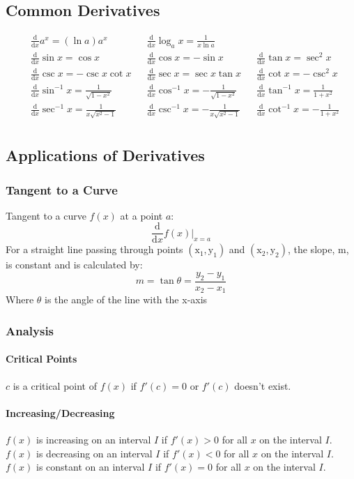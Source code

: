 \documentclass[12pt]{article}
\newcommand{\diff}[1]{\frac{\mathrm{d}}{\mathrm{d}#1}}
\begin{document}
\subsection{Common Derivatives}
\begin{align*}
&\diff{x}a^x = (\ln a)a^x & &\diff{x}\log_a x = \frac{1}{x\ln a} \\
&\diff{x}\sin x = \cos x & &\diff{x}\cos x = -\sin x & &\diff{x}\tan x = \sec^2 x\\
&\diff{x}\csc x = -\csc x \cot x & &\diff{x}\sec x = \sec x \tan x & &\diff{x}\cot x = -\csc^2 x \\
&\diff{x}\sin^{-1}x = \frac{1}{\sqrt{1 - x^2}} & &\diff{x}\cos^{-1}x = - \frac{1}{\sqrt{1 - x^2}} & &\diff{x}\tan^{-1}x = \frac{1}{1 + x^2} \\
&\diff{x}\sec^{-1}x = \frac{1}{ x \sqrt{x^2 - 1}} &  &\diff{x}\csc^{-1}x = -\frac{1}{ x \sqrt{x^2 - 1}} & &\diff{x}\cot^{-1}x = -\frac{1}{1 + x^2} \\
\end{align*}
\subsection{Applications of Derivatives}
\subsubsection{Tangent to a Curve}
Tangent to a curve $f(x)$ at a point $a$:
$$\diff{x}f(x)\Big\rvert_{x=a}$$
For a straight line passing through points $\mathrm{(x_1,y_1)}$ and  $\mathrm{(x_2, y_2)}$, the slope, m, is constant and is calculated by:
$$m = \tan\theta = \frac{y_2 - y_1}{x_2 - x_1}$$
Where $\theta$ is the angle of the line with the x-axis

\subsubsection{Analysis}
\paragraph{Critical Points}
\( c \) is a critical point of \( f(x) \) if \( f'(c)=0 \) or \( f'(c) \) doesn't exist.
\paragraph{Increasing/Decreasing}
\( f(x) \) is increasing on an interval \(I\) if \( f'(x) > 0 \) for all \(x\) on the interval \(I\).
\( f(x) \) is decreasing on an interval \(I\) if \( f'(x) < 0 \) for all \(x\) on the interval \(I\).
\( f(x) \) is constant on an interval \(I\) if \( f'(x) = 0 \) for all \(x\) on the interval \(I\).
\end{document}
